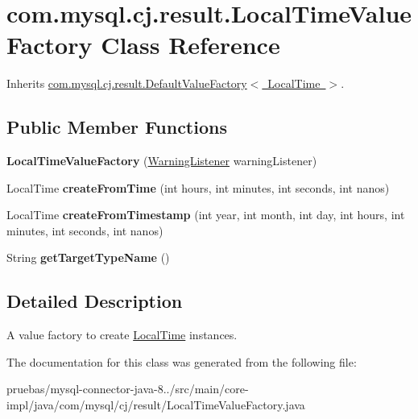 \hypertarget{classcom_1_1mysql_1_1cj_1_1result_1_1_local_time_value_factory}{}\section{com.\+mysql.\+cj.\+result.\+Local\+Time\+Value\+Factory Class Reference}
\label{classcom_1_1mysql_1_1cj_1_1result_1_1_local_time_value_factory}


Inherits \mbox{\hyperlink{classcom_1_1mysql_1_1cj_1_1result_1_1_default_value_factory}{com.\+mysql.\+cj.\+result.\+Default\+Value\+Factory$<$ Local\+Time $>$}}.

\subsection*{Public Member Functions}
\begin{DoxyCompactItemize}
\item 
\mbox{\label{classcom_1_1mysql_1_1cj_1_1result_1_1_local_time_value_factory_ab84fbdb4170bf14ff74ef62ab780843e}} 
{\bfseries Local\+Time\+Value\+Factory} (\mbox{\hyperlink{interfacecom_1_1mysql_1_1cj_1_1_warning_listener}{Warning\+Listener}} warning\+Listener)
\item 
\mbox{\label{classcom_1_1mysql_1_1cj_1_1result_1_1_local_time_value_factory_add3ff17f39736a9b38d644e7383aa6a9}} 
Local\+Time {\bfseries create\+From\+Time} (int hours, int minutes, int seconds, int nanos)
\item 
\mbox{\label{classcom_1_1mysql_1_1cj_1_1result_1_1_local_time_value_factory_a691f57fe6603e179cce35d54f6dd05f3}} 
Local\+Time {\bfseries create\+From\+Timestamp} (int year, int month, int day, int hours, int minutes, int seconds, int nanos)
\item 
\mbox{\label{classcom_1_1mysql_1_1cj_1_1result_1_1_local_time_value_factory_a3419a70fb7929d61229bf3df0f3a12a7}} 
String {\bfseries get\+Target\+Type\+Name} ()
\end{DoxyCompactItemize}


\subsection{Detailed Description}
A value factory to create \mbox{\hyperlink{}{Local\+Time}} instances. 

The documentation for this class was generated from the following file\+:\begin{DoxyCompactItemize}
\item 
pruebas/mysql-\/connector-\/java-\/8../src/main/core-\/impl/java/com/mysql/cj/result/Local\+Time\+Value\+Factory.\+java\end{DoxyCompactItemize}
